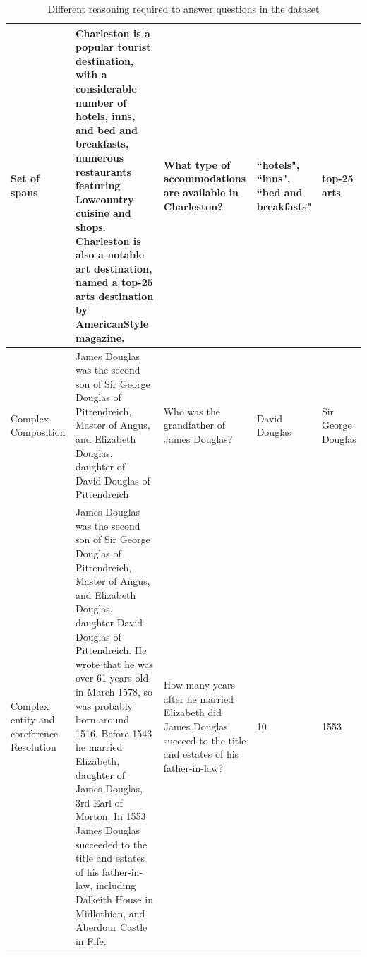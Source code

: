 \begin{table}[t]
\begin{tabular}{|p{1.5cm}|p{8cm}|p{3cm}|p{1.25cm}|p{1.25cm}|}
 \hline
 Set of spans & Charleston is a popular tourist destination, {\color{teal}with a considerable number of hotels, inns, and bed and breakfasts}, numerous restaurants featuring Lowcountry cuisine and shops. Charleston is also a notable art destination, named a top-25 arts destination by AmericanStyle magazine. & What type of accommodations are available in Charleston? &``hotels", ``inns", ``bed and breakfasts" & top-25 arts\\
 \hline
 Complex Composition & James Douglas was the second {\color{olive}son of Sir George Douglas of Pittendreich, Master of Angus, and Elizabeth Douglas, daughter of David Douglas} of Pittendreich & Who was the grandfather of James Douglas? & David Douglas & Sir George Douglas\\
 \hline
 Complex entity and coreference Resolution & {\color{violet}James Douglas} was the second son of Sir George Douglas of Pittendreich, Master of Angus, and Elizabeth Douglas, daughter David Douglas of Pittendreich. He wrote that he was over 61 years old in March 1578, so was probably born around 1516. Before {\color{violet}1543 he married Elizabeth}, daughter of James Douglas, 3rd Earl of Morton. {\color{violet}In 1553 James Douglas succeeded to the title and estates of his father-in-law}, including Dalkeith House in Midlothian, and Aberdour Castle in Fife. & How many years after he married Elizabeth did James Douglas succeed to the title and estates of his father-in-law? & 10 & 1553\\
 \hline
 
\end{tabular}
\caption{Different reasoning required to answer questions in the dataset}
\label{tab:interesting_example}
\end{table}

